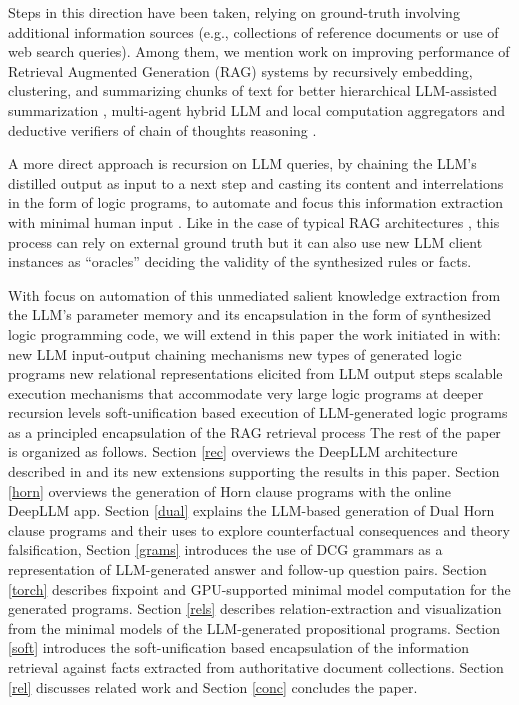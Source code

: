 \documentclass[submission,copyright,creativecommons]{eptcs}
\begin{document}
Steps in this direction have been taken, relying on ground-truth involving additional  information sources (e.g., collections of reference documents or use of web search queries). Among them, we mention work on  improving performance of Retrieval Augmented Generation (RAG) systems \cite{rag20} by recursively embedding, clustering, and summarizing chunks of text for better hierarchical LLM-assisted summarization \cite{raptor24}, multi-agent hybrid LLM and local computation aggregators \cite{langchain} and deductive verifiers of chain of thoughts reasoning \cite{ling2023deductive}.

A more direct approach is recursion on LLM queries, by chaining 
the LLM's distilled output as input to a next step
 and casting its content and interrelations in the form of logic programs,
to automate and focus this information extraction with minimal human input \cite{tarau2023automation,flops24}.
Like in the case of typical RAG architectures \cite{rag20,raptor24}, this process can rely on external ground truth but it can also use new LLM client instances as ``oracles'' deciding the validity of the synthesized rules or facts.

With focus on automation of this unmediated salient knowledge extraction from the LLM's parameter memory and its encapsulation in the form of synthesized logic programming code, we will extend in this paper the work initiated in \cite{tarau2023automation,flops24} with:
\BI
\I new LLM input-output chaining mechanisms
\I new types of generated logic programs
\I new relational representations elicited from LLM output steps
\I scalable execution mechanisms that accommodate very large logic programs at deeper recursion levels
\I soft-unification based execution of LLM-generated logic programs as a principled encapsulation of the RAG retrieval process
\EI
The rest of the paper is organized as follows.
Section \ref{rec} overviews the DeepLLM architecture described in \cite{flops24} and its new extensions supporting the results in this paper.
Section \ref{horn} overviews the generation of Horn clause programs with the online DeepLLM app.
Section \ref{dual} explains the LLM-based generation of Dual Horn clause programs and their uses to explore counterfactual consequences and theory falsification,
Section \ref{grams} introduces the use of DCG grammars as a representation of LLM-generated answer and follow-up question pairs.
Section \ref{torch} describes fixpoint and GPU-supported minimal model computation for the generated programs.
Section \ref{rels} describes relation-extraction and visualization from the minimal models of the LLM-generated propositional programs.
Section \ref{soft} introduces the soft-unification based encapsulation of the information retrieval against facts extracted from authoritative document collections.
Section \ref{rel} discusses related work and Section \ref{conc} concludes the paper.
\end{document}
